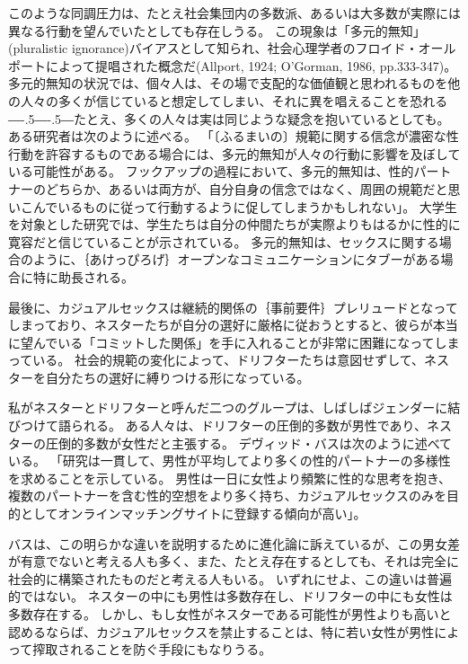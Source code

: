 \documentclass[paper=a4,book,openany]{jlreq}
\def\DDASH{―\kern-.5\zw―\kern-.5\zw―} %
\begin{document}
このような同調圧力は、たとえ社会集団内の多数派、あるいは大多数が実際には異なる行動を望んでいたとしても存在しうる。
この現象は「多元的無知」(pluralistic ignorance)バイアスとして知られ、社会心理学者のフロイド・オールポートによって提唱された概念だ(Allport, 1924; O'Gorman, 1986, pp.333-347)。
\nocite{allport24:_social_psyc,ogorman86:_disc_plur_ignor}多元的無知の状況では、個々人は、その場で支配的な価値観と思われるものを他の人々の多くが信じていると想定してしまい、それに異を唱えることを恐れる{\DDASH}たとえ、多くの人々は実は同じような疑念を抱いているとしても。
ある研究者は次のように述べる。
「〔ふるまいの〕規範に関する信念が濃密な性行動を許容するものである場合には、多元的無知が人々の行動に影響を及ぼしている可能性がある。
フックアップの過程において、多元的無知は、性的パートナーのどちらか、あるいは両方が、自分自身の信念ではなく、周囲の規範だと思いこんでいるものに従って行動するように促してしまうかもしれない」\citep[p.130]{griggs03:_plur_ignor_hook_up}。
大学生を対象とした研究では、学生たちは自分の仲間たちが実際よりもはるかに性的に寛容だと信じていることが示されている\citep{chia06:_how_media_cont,reiber10:_hook_up}。
多元的無知は、セックスに関する場合のように、｛あけっぴろげ｝{オープン}なコミュニケーションにタブーがある場合に特に助長される。

最後に、カジュアルセックスは継続的関係の｛事前要件｝{プレリュード}となってしまっており、ネスターたちが自分の選好に厳格に従おうとすると、彼らが本当に望んでいる「コミットした関係」を手に入れることが非常に困難になってしまっている。
社会的規範の変化によって、ドリフターたちは意図せずして、ネスターを自分たちの選好に縛りつける形になっている。

私がネスターとドリフターと呼んだ二つのグループは、しばしばジェンダーに結びつけて語られる。
ある人々は、ドリフターの圧倒的多数が男性であり、ネスターの圧倒的多数が女性だと主張する\citep[cf.][]{regnerus12:_cont_matin_mark}。
デヴィッド・バスは次のように述べている。
「研究は一貫して、男性が平均してより多くの性的パートナーの多様性を求めることを示している。
男性は一日に女性より頻繁に性的な思考を抱き、複数のパートナーを含む性的空想をより多く持ち、カジュアルセックスのみを目的としてオンラインマッチングサイトに登録する傾向が高い」\citep{buss16:_what_do_you}。

バスは、この明らかな違いを説明するために進化論に訴えているが、この男女差が有意でないと考える人も多く、また、たとえ存在するとしても、それは完全に社会的に構築されたものだと考える人もいる。
いずれにせよ、この違いは普遍的ではない。
ネスターの中にも男性は多数存在し、ドリフターの中にも女性は多数存在する。
しかし、もし女性がネスターである可能性が男性よりも高いと認めるならば、カジュアルセックスを禁止することは、特に若い女性が男性によって搾取されることを防ぐ手段にもなりうる。
\end{document}
